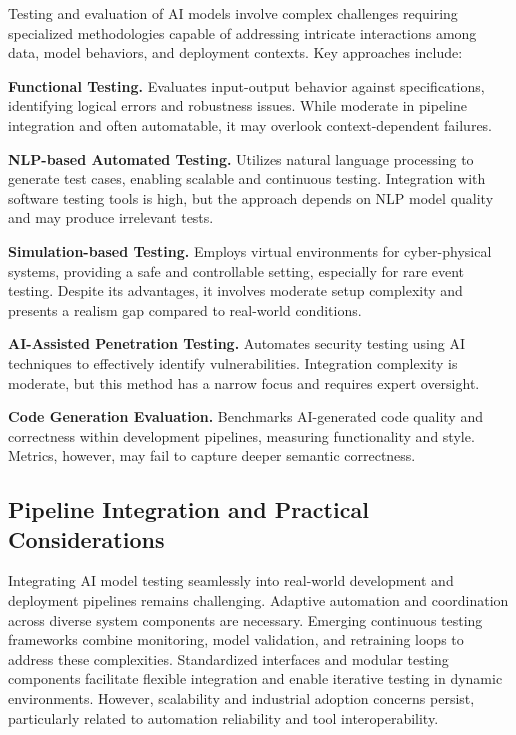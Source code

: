 \documentclass[sigconf]{acmart}
\begin{document}
Testing and evaluation of AI models involve complex challenges requiring specialized methodologies capable of addressing intricate interactions among data, model behaviors, and deployment contexts. Key approaches include:

\textbf{Functional Testing.} Evaluates input-output behavior against specifications, identifying logical errors and robustness issues. While moderate in pipeline integration and often automatable, it may overlook context-dependent failures.

\textbf{NLP-based Automated Testing.} Utilizes natural language processing to generate test cases, enabling scalable and continuous testing. Integration with software testing tools is high, but the approach depends on NLP model quality and may produce irrelevant tests.

\textbf{Simulation-based Testing.} Employs virtual environments for cyber-physical systems, providing a safe and controllable setting, especially for rare event testing. Despite its advantages, it involves moderate setup complexity and presents a realism gap compared to real-world conditions.

\textbf{AI-Assisted Penetration Testing.} Automates security testing using AI techniques to effectively identify vulnerabilities. Integration complexity is moderate, but this method has a narrow focus and requires expert oversight.

\textbf{Code Generation Evaluation.} Benchmarks AI-generated code quality and correctness within development pipelines, measuring functionality and style. Metrics, however, may fail to capture deeper semantic correctness.

\subsection{Pipeline Integration and Practical Considerations}

Integrating AI model testing seamlessly into real-world development and deployment pipelines remains challenging. Adaptive automation and coordination across diverse system components are necessary. Emerging continuous testing frameworks combine monitoring, model validation, and retraining loops to address these complexities. Standardized interfaces and modular testing components facilitate flexible integration and enable iterative testing in dynamic environments. However, scalability and industrial adoption concerns persist, particularly related to automation reliability and tool interoperability.
\end{document}
